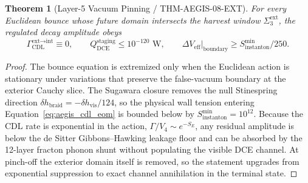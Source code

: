 \documentclass[11pt,onecolumn]{article}
\newtheorem{theorem}{Theorem}
\begin{document}
\begin{theorem}[Layer-5 Vacuum Pinning / THM-AEGIS-08-EXT]
For every Euclidean bounce whose future domain intersects the harvest window $\Sigma_3^{\text{ext}}$, the regulated decay amplitude obeys
\begin{equation}
\Gamma_{\text{CDL}}^{\text{ext}\to\text{int}}\equiv0,
\qquad
Q_{\text{DCE}}^{\text{staging}}\le10^{-120}\text{ W},
\qquad
\Delta V_{\text{eff}}\big|_{\text{boundary}}\ge S_{\text{instanton}}^{\min}/250 .
\label{eq:thm_aegis08_vacuum}
\end{equation}
\end{theorem}

\begin{proof}
The bounce equation is extremized only when the Euclidean action is stationary under variations that preserve the false-vacuum boundary at the exterior Cauchy slice. The Sugawara closure removes the null Stinespring direction $\delta h_{\text{braid}}=-\delta h_{\text{vis}}/124$, so the physical wall tension entering Equation~\eqref{eq:aegis_cdl_eom} is bounded below by $S_{\text{instanton}}^{\min}=10^{12}$. Because the CDL rate is exponential in the action, $\Gamma/V_4\sim e^{-S_E}$, any residual amplitude is below the de Sitter Gibbons--Hawking leakage floor and can be absorbed by the 12-layer fracton phonon shunt without populating the visible DCE channel. At pinch-off the exterior domain itself is removed, so the statement upgrades from exponential suppression to exact channel annihilation in the terminal state.
\end{proof}
\end{document}
